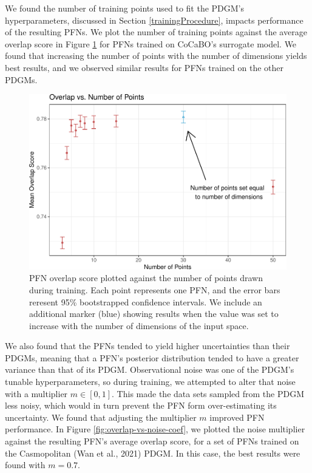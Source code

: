 \documentclass[12pt,twoside]{reedthesis}
\begin{document}
We found the number of training points used to fit the PDGM's hyperparameters, discussed in Section \ref{trainingProcedure}, impacts performance of the resulting PFNs. We plot the number of training points against the average overlap score in Figure \ref{fig:overlap-vs-no-points} for PFNs trained on CoCaBO's surrogate model. We found that increasing the number of points with the number of dimensions yields best results, and we observed similar results for PFNs trained on the other PDGMs.
\begin{figure}
\centering
\includegraphics{thesis_files/figure-latex/overlap-vs-no-points-1.pdf}
\caption{\label{fig:overlap-vs-no-points}PFN overlap score plotted against the number of points drawn during training. Each point represents one PFN, and the error bars reresent 95\% bootstrapped confidence intervals. We include an additional marker (blue) showing results when the value was set to increase with the number of dimensions of the input space.}
\end{figure}
We also found that the PFNs tended to yield higher uncertainties than their PDGMs, meaning that a PFN's posterior distribution tended to have a greater variance than that of its PDGM. Observational noise was one of the PDGM's tunable hyperparameters, so during training, we attempted to alter that noise with a multiplier \(m\in[0,1]\). This made the data sets sampled from the PDGM less noisy, which would in turn prevent the PFN form over-estimating its uncertainty. We found that adjusting the multiplier \(m\) improved PFN performance. In Figure \ref{fig:overlap-vs-noise-coef}, we plotted the noise multiplier against the resulting PFN's average overlap score, for a set of PFNs trained on the Casmopolitan (Wan et al., 2021) PDGM. In this case, the best results were found with \(m=0.7\).
\end{document}
